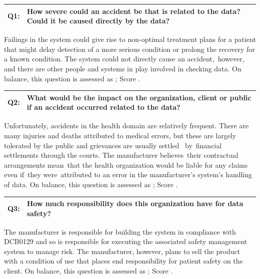 \addtocounter{table}{-1} %
\begin{longtable*}[H]
	{|L{}|L{}|}
	\hline
	Q1: & How severe could an accident be that is related to the data? Could it be caused directly by the data?\\
	\hline
\end{longtable*}

Failings in the system could give rise to non-optimal treatment plans for a patient that might delay detection of a more serious condition or prolong the recovery for a known condition. \cbstart The system could not directly cause an accident,\cbend\ however, and there are other people and systems in play involved in checking data. On balance, this question is assessed as ; Score .

\addtocounter{table}{-1} %
\begin{longtable*}[H]
	{|L{}|L{}|}
	\hline
	Q2: & What would be the impact on the organization, client or public if an accident occurred related to the data?\\
	\hline
\end{longtable*}

Unfortunately, accidents in the health domain are relatively frequent. There are many injuries and deaths attributed to medical errors, but these are largely tolerated by the public and grievances are usually settled \cbstart\ by\cbend\ financial settlements through the courts. The manufacturer believes\cbstart\ their contractual arrangements mean\cbend\ that the health organization would be liable for any claims even if\cbstart\ they were\cbend\ attributed to an error in the manufacturer's system's handling of data. On balance, this question is assessed as ; Score .

\addtocounter{table}{-1} %
\begin{longtable*}[H]
	{|L{}|L{}|}
	\hline
	Q3: & How much responsibility does this organization have for data safety?\\
	\hline
\end{longtable*}

The manufacturer is responsible for building the system in compliance with
DCB0129 \cite{citation:dcb0129clinical}
and so is responsible for executing the associated safety management system to manage risk. The manufacturer, however, plans to sell the product with a condition of use that places end responsibility for patient safety on the client. On balance, this question is assessed as ; Score .

